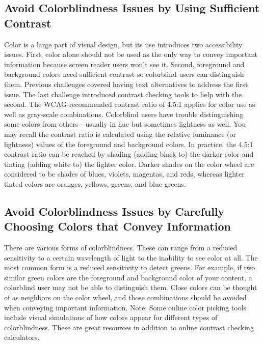 \documentclass{article}%
\begin{document}
%
\subsection{Avoid Colorblindness Issues by Using Sufficient Contrast}%
\label{subsec:AvoidColorblindnessIssuesbyUsingSufficientContrast}%
Color is a large part of visual design, but its use introduces two accessibility issues. First, color alone should not be used as the only way to convey important information because screen reader users won't see it. Second, foreground and background colors need sufficient contrast so colorblind users can distinguish them.\newline%
Previous challenges covered having text alternatives to address the first issue. The last challenge introduced contrast checking tools to help with the second. The WCAG{-}recommended contrast ratio of 4.5:1 applies for color use as well as gray{-}scale combinations.\newline%
Colorblind users have trouble distinguishing some colors from others {-} usually in hue but sometimes lightness as well. You may recall the contrast ratio is calculated using the relative luminance (or lightness) values of the foreground and background colors.\newline%
In practice, the 4.5:1 contrast ratio can be reached by shading (adding black to) the darker color and tinting (adding white to) the lighter color. Darker shades on the color wheel are considered to be shades of blues, violets, magentas, and reds, whereas lighter tinted colors are oranges, yellows, greens, and blue{-}greens.\newline%

%
\subsection{Avoid Colorblindness Issues by Carefully Choosing Colors that Convey Information}%
\label{subsec:AvoidColorblindnessIssuesbyCarefullyChoosingColorsthatConveyInformation}%
There are various forms of colorblindness. These can range from a reduced sensitivity to a certain wavelength of light to the inability to see color at all. The most common form is a reduced sensitivity to detect greens.\newline%
For example, if two similar green colors are the foreground and background color of your content, a colorblind user may not be able to distinguish them. Close colors can be thought of as neighbors on the color wheel, and those combinations should be avoided when conveying important information.\newline%
Note: Some online color picking tools include visual simulations of how colors appear for different types of colorblindness. These are great resources in addition to online contrast checking calculators.\newline%
\end{document}
